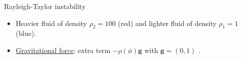 





\begin{frame}{Rayleigh-Taylor instability}
  \small
  \begin{itemize}
    \item Heavier fluid of density $\rho_2=100$ (red) and lighter fluid of density $\rho_1=1$ (blue).
    \item  \underline{Gravitational force}: extra term \alert{$-\rho(\phi)\boldsymbol{g}$} with $\boldsymbol{g}=(0,1)$ .%
  \end{itemize}

  \begin{figure}[htbp]
    \centering

    \if{}
    \fi
  \end{figure}
\end{frame}

